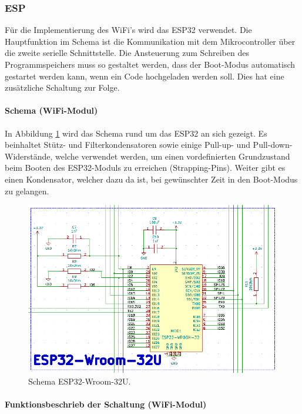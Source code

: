 \newpage
\subsubsection{ESP}
\label{subsubsec:ESP}

Für die Implementierung des WiFi's wird das ESP32 verwendet. Die Hauptfunktion im Schema ist die Kommunikation mit dem Mikrocontroller über die zweite serielle Schnittstelle. Die Ansteuerung zum Schreiben des Programmspeichers muss so gestaltet werden, dass der Boot-Modus automatisch gestartet werden kann, wenn ein Code hochgeladen werden soll. Dies hat eine zusätzliche Schaltung zur Folge. 

\paragraph{Schema (WiFi-Modul)}\mbox{}

In Abbildung \ref{fig:Schema_ESP32} wird das Schema rund um das ESP32 an sich gezeigt. Es beinhaltet Stütz- und Filterkondensatoren sowie einige Pull-up- und Pull-down-Widerstände, welche verwendet werden, um einen vordefinierten Grundzustand beim Booten des ESP32-Moduls zu erreichen (Strapping-Pins). Weiter gibt es einen Kondensator, welcher dazu da ist, bei gewünschter Zeit in den Boot-Modus zu gelangen. 

\begin{figure}[h!]
	\centering
	\includegraphics[width=\textwidth]{graphics/Schema_ESP32}
	\caption{Schema ESP32-Wroom-32U.}
	\label{fig:Schema_ESP32}
\end{figure}

\paragraph{Funktionsbeschrieb der Schaltung (WiFi-Modul)}\mbox{}


